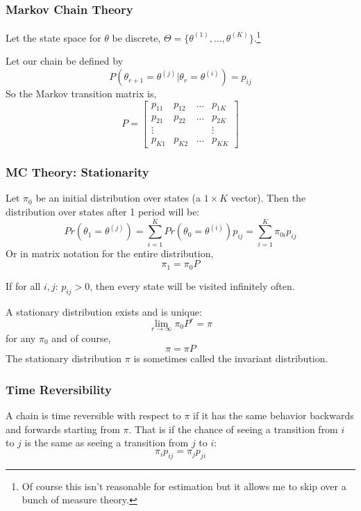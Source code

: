\documentclass[11pt, aspectratio=169]{beamer}
\begin{document}
\begin{frame}[c]\frametitle{Markov Chain Theory}    

Let the state space for $\theta$ be discrete, $\Theta = \{\theta^{(1)}, \ldots, \theta^{(K)} \}$.\footnote{Of course this isn't reasonable for estimation but it allows me to 
skip over a bunch of measure theory.} 

\vspace{2em}
Let our chain be defined by
$$P(\theta_{r+1} = \theta^{(j)} | \theta_r = \theta^{(i)}) = p_{ij} $$
So the Markov transition matrix is, 
$$P = \begin{bmatrix} p_{11} & p_{12} & \ldots & p_{1K} \\
 p_{21} & p_{22} & \ldots&  p_{2K} \\
 \vdots & & & \vdots \\
 p_{K1} & p_{K2} & \ldots&  p_{KK} \end{bmatrix}$$

\end{frame}



\begin{frame}[c]\frametitle{MC Theory: Stationarity}
    

Let $\pi_0$ be an initial distribution over states (a $1 \times K$ vector). Then the distribution over states after 1 period will be:
$$Pr( \theta_1 = \theta^{(j)}) = \sum_{i=1}^K Pr(\theta_0 = \theta^{(i)}) p_{ij} = \sum_{i=1}^K \pi_{0i} p_{ij} $$
Or in matrix notation for the entire distribution, 
$$\pi_1 = \pi_0 P$$

\vspace{.5em}
If for all $i,j$: $p_{ij} > 0$, then every state will be visited infinitely often.

\vspace{1em}
A stationary distribution exists and is unique:
$$ \lim_{r \rightarrow \infty} \pi_0P^r = \pi$$
for any $\pi_0$ and of course, 
$$ \pi = \pi P $$
The stationary distribution $\pi$ is sometimes called the invariant distribution. 

\end{frame}


\begin{frame}[c]\frametitle{Time Reversibility}
    
\begin{definition} A chain is time reversible with respect to $\pi$ if it has the same behavior backwards and forwards starting from $\pi$. That is if the chance of seeing a transition from $i$ to $j$ is the same as seeing a transition from $j$ to $i$: 
$$ \pi_i p_{ij} = \pi_j p_{ji}$$
\end{definition}


\end{frame}
\end{document}

